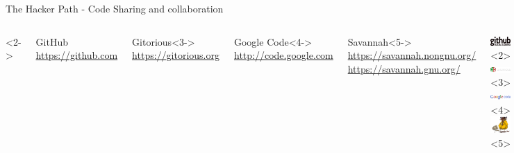 \documentclass[slidestop,compress,brown]{beamer}
\newcommand\en[1]{{\english #1}}
\begin{document}
\begin{frame}{\en{The Hacker Path - Code Sharing and collaboration}}
  \begin{columns}[c]
    <2->
    \begin{block}{\en{GitHub}}
      \url{https://github.com}
     \end{block}
    \begin{block}{\en{Gitorious}}<3->
      \url{https://gitorious.org}
    \end{block}
    \begin{block}{\en{Google Code}}<4->
      \url{http://code.google.com}
    \end{block}
    \begin{block}{\en{Savannah}}<5->
      \url{https://savannah.nongnu.org/}\\
      \url{https://savannah.gnu.org/}
    \end{block}
    \includegraphics[width=4cm,keepaspectratio]{github}<2>
    \includegraphics[width=4cm,keepaspectratio]{gitorious}<3>
    \includegraphics[width=4cm,keepaspectratio]{code_logo}<4>
    \includegraphics[width=4cm,keepaspectratio]{gnu-monk}<5>
 \end{columns}
\end{frame}
\end{document}
